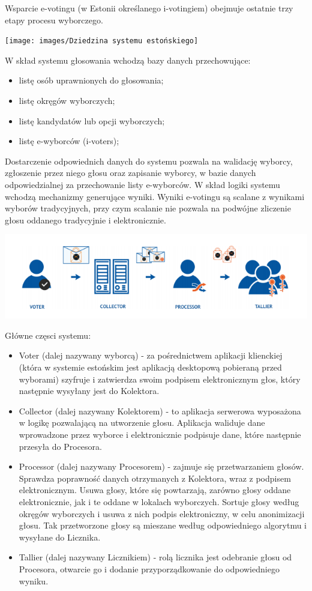 \documentclass{report}
\begin{document}
Wsparcie e-votingu (w Estonii określanego i-votingiem) obejmuje ostatnie trzy etapy procesu wyborczego.

\texttt{[image: images/Dziedzina systemu estońskiego]}

W skład systemu głosowania wchodzą bazy danych przechowujące:
\begin{itemize}
    \item listę osób uprawnionych do głosowania;
    \item listę okręgów wyborczych;
    \item listę kandydatów lub opcji wyborczych;
    \item listę e-wyborców (i-voters);
\end{itemize}

Dostarczenie odpowiednich danych do systemu pozwala na walidację wyborcy, zgłoszenie przez 
niego głosu oraz zapisanie wyborcy, w bazie danych odpowiedzialnej za przechowanie listy e-wyborców. W skład logiki systemu wchodzą mechanizmy generujące wyniki. Wyniki e-votingu są scalane z wynikami wyborów tradycyjnych, przy czym scalanie nie pozwala na podwójne zliczenie głosu oddanego tradycyjnie i elektronicznie.


\includegraphics[width=\textwidth]{images/Główne częsci systemu estońskiego.png}

Główne częsci systemu:
\begin{itemize}
    \item Voter (dalej nazywany wyborcą) - za pośrednictwem aplikacji klienckiej (która w systemie estońskim jest aplikacją desktopową pobieraną przed wyborami) szyfruje i zatwierdza swoim podpisem elektronicznym głos, który następnie wysyłany jest do Kolektora.
    \item Collector (dalej nazywany Kolektorem) - to aplikacja serwerowa wyposażona w logikę pozwalającą na utworzenie głosu. Aplikacja waliduje dane wprowadzone przez wyborce i elektronicznie podpisuje dane, które następnie przesyła do Procesora.
    \item Processor (dalej nazywany Procesorem) - zajmuje się przetwarzaniem głosów. Sprawdza poprawność danych otrzymanych z Kolektora, wraz z podpisem elektronicznym. Usuwa głosy, które się powtarzają, zarówno głosy oddane elektronicznie, jak i te oddane w lokalach wyborczych. Sortuje głosy według okręgów wyborczych i usuwa z nich podpis elektroniczny, w celu anonimizacji głosu. Tak przetworzone głosy są mieszane według odpowiedniego algorytmu i wysyłane do Licznika.
    \item Tallier (dalej nazywany Licznikiem) - rolą licznika jest odebranie głosu od Procesora, otwarcie go i dodanie przyporządkowanie do odpowiedniego wyniku.
\end{itemize}
\end{document}

